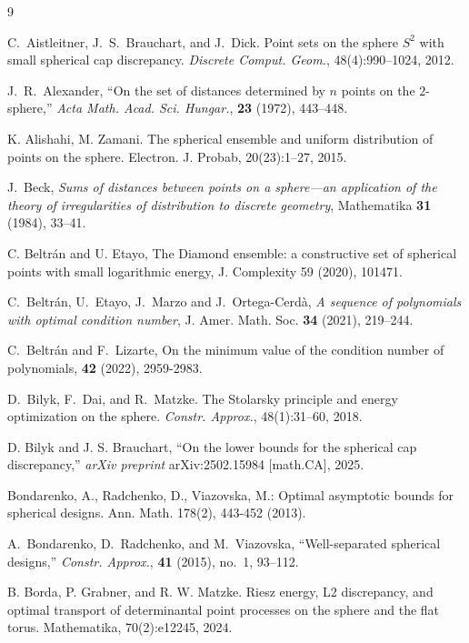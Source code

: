 \documentclass[11pt]{amsart}
\begin{document}
\begin{thebibliography}{9}



 C.~Aistleitner, J.~S.~Brauchart, and J.~Dick. Point sets on the sphere $S^2$ with small spherical cap discrepancy. \emph{Discrete Comput. Geom.}, 48(4):990--1024, 2012.

 J.~R.~Alexander, ``On the set of distances determined by $n$ points on the $2$-sphere,'' \emph{Acta Math. Acad. Sci. Hungar.}, \textbf{23} (1972), 443--448.

K. Alishahi, M. Zamani. The spherical ensemble and uniform distribution of points on the sphere.
Electron. J. Probab, 20(23):1–27, 2015.

J.~Beck, \emph{Sums of distances between points on a sphere---an application
of the theory of irregularities of distribution to discrete geometry},
Mathematika \textbf{31} (1984), 33--41.

C. Beltrán and U. Etayo,
The Diamond ensemble: a constructive set of spherical points with small logarithmic energy,
J. Complexity 59 (2020), 101471.

C.~Beltr\'an, U.~Etayo, J.~Marzo and J.~Ortega-Cerd\`a,
\emph{A sequence of polynomials with optimal condition number},
J. Amer. Math. Soc. \textbf{34} (2021), 219--244.

C.~Beltrán and F.~Lizarte, \newblock On the minimum value of the condition number of polynomials,  \textbf{42} (2022), 2959-2983.



 D.~Bilyk, F.~Dai, and R.~Matzke. The Stolarsky principle and energy optimization on the sphere. \emph{Constr. Approx.}, 48(1):31--60, 2018.

 D. Bilyk and J. S. Brauchart, ``On the lower bounds for the spherical cap discrepancy,'' \emph{arXiv preprint} arXiv:2502.15984 [math.CA], 2025.

Bondarenko, A., Radchenko, D., Viazovska, M.: Optimal asymptotic bounds for spherical designs.
Ann. Math. 178(2), 443-452 (2013).

 A.~Bondarenko, D.~Radchenko, and M.~Viazovska, ``Well-separated spherical designs,'' \emph{Constr. Approx.}, \textbf{41} (2015), no.~1, 93--112.

B. Borda, P. Grabner, and R. W. Matzke. Riesz energy, L2 discrepancy, and optimal transport of
determinantal point processes on the sphere and the flat torus. Mathematika, 70(2):e12245, 2024.


\end{thebibliography}
\end{document}
